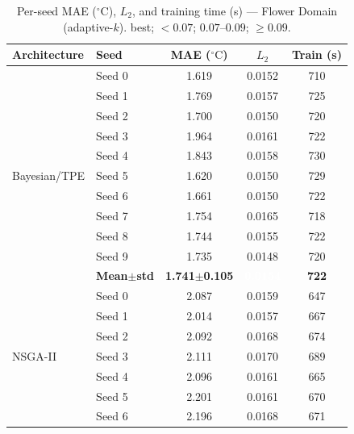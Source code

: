 \begin{table}[H]
\centering\small\setlength{\tabcolsep}{4pt}
\caption{Per-seed MAE ($^\circ\mathrm{C}$), $L_2$, and training time (s) --- Flower Domain (adaptive-$k$).
\phantom{x} best; \phantom{x} ${<}0.07$; \phantom{x} $0.07$--$0.09$; \phantom{x} ${\geq}0.09$.}
\label{tab:adap_flower_seeds}
\begin{tabular}{@{}llccc@{}}
\toprule
Architecture & Seed & MAE ($^\circ\mathrm{C}$) & $L_2$ & Train (s) \\
\midrule
\multirow{11}{*}{Bayesian/TPE}
  & Seed 0 & {\small 1.619} & {\small 0.0152} & {\small 710} \\
  & Seed 1 & {\small 1.769} & {\small 0.0157} & {\small 725} \\
  & Seed 2 & {\small 1.700} & {\small 0.0150} & {\small 720} \\
  & Seed 3 & {\small 1.964} & {\small 0.0161} & {\small 722} \\
  & Seed 4 & {\small 1.843} & {\small 0.0158} & {\small 730} \\
  & Seed 5 & {\small 1.620} & {\small 0.0150} & {\small 729} \\
  & Seed 6 & {\small 1.661} & {\small 0.0150} & {\small 722} \\
  & Seed 7 & {\small 1.754} & {\small 0.0165} & {\small 718} \\
  & Seed 8 & {\small 1.744} & {\small 0.0155} & {\small 722} \\
  & Seed 9 & {\small 1.735} & {\small 0.0148} & {\small 720} \\
  & \textbf{Mean$\pm$std} & \textbf{1.741$\pm$0.105} & \cellcolor{ForestGreen!55}\textcolor{white}{\textbf{0.0154}} & \textbf{722} \\
\midrule
\multirow{11}{*}{NSGA-II}
  & Seed 0 & {\small 2.087} & {\small 0.0159} & {\small 647} \\
  & Seed 1 & {\small 2.014} & {\small 0.0157} & {\small 667} \\
  & Seed 2 & {\small 2.092} & {\small 0.0168} & {\small 674} \\
  & Seed 3 & {\small 2.111} & {\small 0.0170} & {\small 689} \\
  & Seed 4 & {\small 2.096} & {\small 0.0161} & {\small 665} \\
  & Seed 5 & {\small 2.201} & {\small 0.0161} & {\small 670} \\
  & Seed 6 & {\small 2.196} & {\small 0.0168} & {\small 671} \\

\end{tabular}
\end{table}

